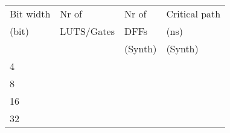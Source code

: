 \begin{tabular}{llll}
\hline
\hline
 {Bit width} & {Nr of}      & {Nr of}   & {Critical path} \\
 {(bit)}     & {LUTS/Gates} & {DFFs}    & {(ns)}          \\
             &              & {(Synth)} & {(Synth)}       \\
 4           &              &           &                 \\
 8           &              &           &                 \\
 16          &              &           &                 \\
 32          &              &           &                 \\
\hline
\end{tabular}
